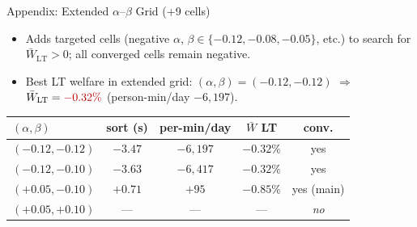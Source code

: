 \documentclass[11pt,aspectratio=169]{beamer}
\newcommand{\bad}[1]{\textcolor{red!70!black}{#1}}
\newcommand{\back}[1]{\hyperlink{#1}{\beamerreturnbutton{back}}}
\begin{document}
\begin{frame}[label=appgridext]{Appendix: Extended $\alpha$--$\beta$ Grid (+9 cells)}
\scriptsize
\begin{itemize}\footnotesize
  \item Adds targeted cells (negative $\alpha$, $\beta\in\{-0.12,-0.08,-0.05\}$, etc.) to search for $\bar W_{\mathrm{LT}}>0$; all converged cells remain \bad{negative}.
  \item Best LT welfare in extended grid: $(\alpha,\beta)=(-0.12,-0.12)$ $\Rightarrow$ $\bar W_{\mathrm{LT}}=\bad{-0.32\%}$ (person-min/day $-6{,}197$).
\end{itemize}
\vspace{0.2em}
\begin{center}
\begin{tabular}{lcccc}
\toprule
$(\alpha,\beta)$ & sort (s) & per-min/day & $\bar W$ LT & conv. \\
\midrule
$(-0.12,-0.12)$ & $-3.47$ & $-6{,}197$ & \textbf{$-0.32\%$} & yes \\
$(-0.12,-0.10)$ & $-3.63$ & $-6{,}417$ & $-0.32\%$ & yes \\
$(+0.05,-0.10)$ & $+0.71$ & $+95$ & $-0.85\%$ & yes (main) \\
$(+0.05,+0.10)$ & --- & --- & --- & \emph{no} \\
\bottomrule
\end{tabular}
\end{center}
\centering\back{data}
\end{frame}
\end{document}
